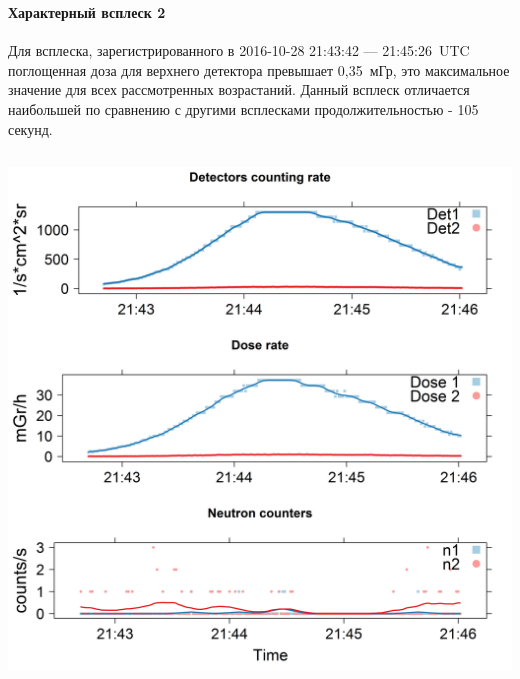 \documentclass[t, aspectratio=43]{beamer}
\begin{document}
\begin{frame}	
\frametitle{\insertsection} 
\framesubtitle{Характерный всплеск 2}

\tiny{

	Для всплеска, зарегистрированного в 2016-10-28 21:43:42 --- 21:45:26~UTC поглощенная доза для верхнего детектора превышает 0,35~мГр, это максимальное значение для всех рассмотренных возрастаний. Данный всплеск отличается наибольшей по сравнению с другими всплесками продолжительностью - 105 секунд.}

\begin{columns}
	\begin{column}[t]{.5\textwidth}
	\centering 	
	\includegraphics[width=1\linewidth]{images/flash281016}
	

\end{column}
\end{columns}
\end{frame}
\end{document}
